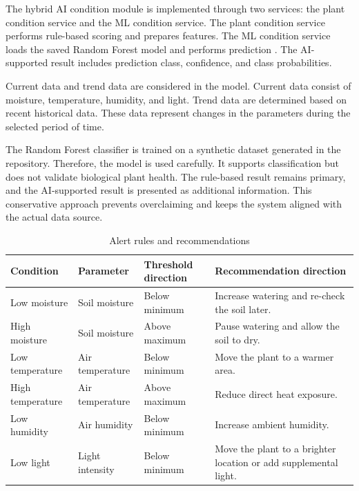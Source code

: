 The hybrid AI condition module is implemented through two services: the plant condition service and the ML condition service. The plant condition service performs rule-based scoring and prepares features. The ML condition service loads the saved Random Forest model and performs prediction \cite{breiman2001randomforest,pedregosa2011scikit}. The AI-supported result includes prediction class, confidence, and class probabilities.

Current data and trend data are considered in the model. Current data consist of moisture, temperature, humidity, and light. Trend data are determined based on recent historical data. These data represent changes in the parameters during the selected period of time.

The Random Forest classifier is trained on a synthetic dataset generated in the repository. Therefore, the model is used carefully. It supports classification but does not validate biological plant health. The rule-based result remains primary, and the AI-supported result is presented as additional information. This conservative approach prevents overclaiming and keeps the system aligned with the actual data source.

\begin{table}[H]
\centering
\caption{Alert rules and recommendations}
\label{tab:alert-rules-recommendations}
\begin{tabular}{p{}p{}p{}p{}}
\hline
\textbf{Condition} & \textbf{Parameter} & \textbf{Threshold direction} & \textbf{Recommendation direction} \\
\hline
Low moisture & Soil moisture & Below minimum & Increase watering and re-check the soil later. \\
High moisture & Soil moisture & Above maximum & Pause watering and allow the soil to dry. \\
Low temperature & Air temperature & Below minimum & Move the plant to a warmer area. \\
High temperature & Air temperature & Above maximum & Reduce direct heat exposure. \\
Low humidity & Air humidity & Below minimum & Increase ambient humidity. \\
Low light & Light intensity & Below minimum & Move the plant to a brighter location or add supplemental light. \\
\hline
\end{tabular}
\end{table}

